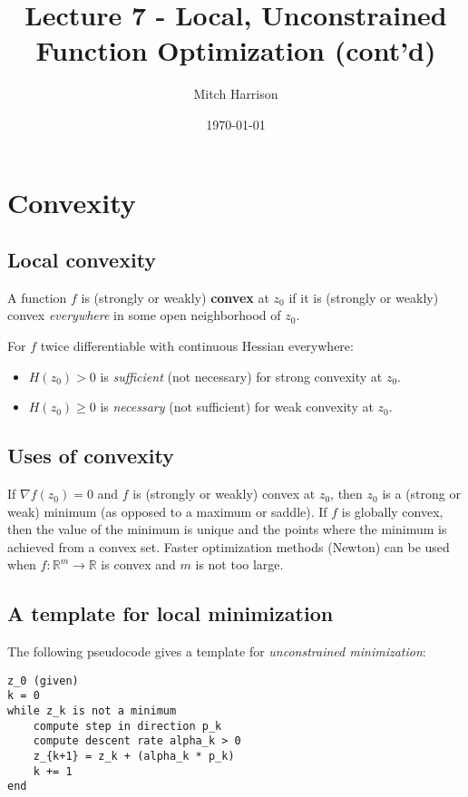 \documentclass[titlepage, 12pt, leqno]{article}
\title{\Huge{Lecture 7 - Local, Unconstrained Function Optimization (cont'd)}}
\author{\large{Mitch Harrison}}
\date{\today}
\begin{document}
\setlength{\parskip}{1\baselineskip}
\setlength{\parindent}{15pt}
\maketitle
\tableofcontents
\newpage


\section{Convexity}
\subsection{Local convexity}
\begin{definition}
    A function $f$ is (strongly or weakly) \textbf{convex} at $z_{0}$ if it is
    (strongly or weakly) convex \textit{everywhere} in some open neighborhood of
    $z_{0}$.
\end{definition}

For $f$ twice differentiable with continuous Hessian everywhere:
\begin{itemize}
    \item $H(z_{0})>0$ is \textit{sufficient} (not necessary) for strong
        convexity at $z_{0}$.
    \item $H(z_{0})\ge 0$ is \textit{necessary} (not sufficient) for weak 
        convexity at $z_{0}$.
\end{itemize}

\subsection{Uses of convexity}
If $\nabla f(z_{0}) = 0 $ and $f$ is (strongly or weakly) convex at $z_{0}$, then
$z_{0}$ is a (strong or weak) minimum (as opposed to a maximum or saddle). If
$f$ is globally convex, then the value of the minimum is unique and the points 
where the minimum is achieved from a convex set. Faster optimization methods
(Newton) can be used when $f : \mathbb{R}^{m}\rightarrow \mathbb{R}$ is convex
and $m$ is not too large.

\subsection{A template for local minimization}
The following pseudocode gives a template for \textit{unconstrained
minimization}:
\begin{verbatim}
z_0 (given)
k = 0
while z_k is not a minimum
    compute step in direction p_k
    compute descent rate alpha_k > 0
    z_{k+1} = z_k + (alpha_k * p_k)
    k += 1
end
\end{verbatim}
\end{document}
